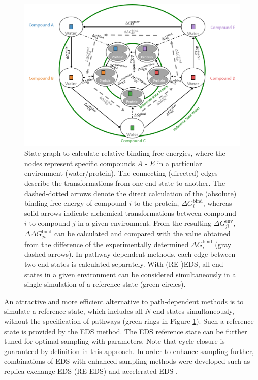 \begin{figure}[h!]
    \centering
    \includegraphics[width=\columnwidth]{fig/intro/State_graph.png}
    \caption{State graph to calculate relative binding free energies, where the nodes represent specific compounds $A$ - $E$ in a particular environment (water/protein). 
    The connecting (directed) edges describe the transformations from one end state to another. The dashed-dotted arrows denote the direct calculation of the (absolute) binding free energy of compound $i$ to the protein, $\Delta G_{i}^\text{bind}$, whereas solid arrows indicate alchemical transformations between compound $i$ to compound $j$ in a given environment. From the resulting $\Delta G_{ji}^\text{env}$, $\Delta \Delta G^\text{bind}_{ji}$ can be calculated and compared with the value obtained from the difference of the experimentally determined $\Delta G_{i}^\text{bind}$ (gray dashed arrows).
    In pathway-dependent methods, each edge between two end states is calculated separately. With (RE-)EDS, all end states in a given environment can be considered simultaneously in a single simulation of a reference state (green circles).}
    \label{fig: StateGraph}
\end{figure}

An attractive and more efficient alternative to path-dependent methods is to simulate a reference state, which includes all $N$ end states simultaneously, without the specification of pathways (green rings in Figure \ref{fig: StateGraph}). Such a reference state is provided by the EDS \cite{Christ2007, Christ2008, Christ2009, Riniker2011} method. The EDS reference state can be further tuned for optimal sampling with parameters. Note that cycle closure is guaranteed by definition in this approach.
%
In order to enhance sampling further, combinations of EDS with enhanced sampling methods were developed such as replica-exchange EDS (RE-EDS) \cite{Lee2014, Sidler2016, Sidler2017} and accelerated EDS \cite{Perthold2018, Perthold2020}.

